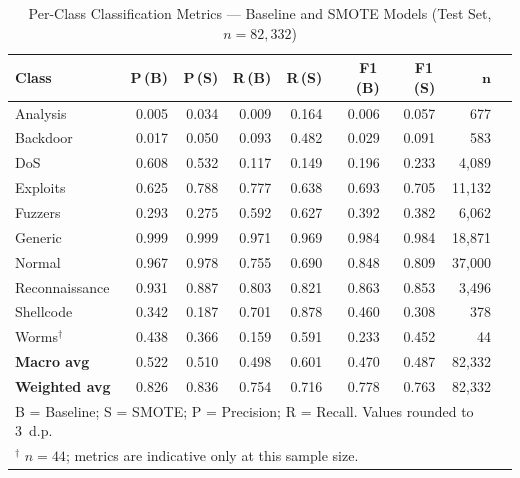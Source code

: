 \documentclass[conference,a4paper]{IEEEtran}
\begin{document}
\begin{table}[t]
  \caption{Per-Class Classification Metrics --- Baseline and SMOTE Models
           (Test Set, $n=82{,}332$)}
  \label{tab:perclass}
  \centering
  \begin{tabular}{lrrrrrrrr}
    \toprule
    \textbf{Class} &
      \textbf{P\,(B)} & \textbf{P\,(S)} &
      \textbf{R\,(B)} & \textbf{R\,(S)} &
      \textbf{F1\,(B)} & \textbf{F1\,(S)} &
      $\bm{n}$ \\
    \midrule
    Analysis          & 0.005 & 0.034 & 0.009 & 0.164 & 0.006 & 0.057 & 677 \\
    Backdoor          & 0.017 & 0.050 & 0.093 & 0.482 & 0.029 & 0.091 & 583 \\
    DoS               & 0.608 & 0.532 & 0.117 & 0.149 & 0.196 & 0.233 & 4,089 \\
    Exploits          & 0.625 & 0.788 & 0.777 & 0.638 & 0.693 & 0.705 & 11,132 \\
    Fuzzers           & 0.293 & 0.275 & 0.592 & 0.627 & 0.392 & 0.382 & 6,062 \\
    Generic           & 0.999 & 0.999 & 0.971 & 0.969 & 0.984 & 0.984 & 18,871 \\
    Normal            & 0.967 & 0.978 & 0.755 & 0.690 & 0.848 & 0.809 & 37,000 \\
    Reconnaissance    & 0.931 & 0.887 & 0.803 & 0.821 & 0.863 & 0.853 & 3,496 \\
    Shellcode         & 0.342 & 0.187 & 0.701 & 0.878 & 0.460 & 0.308 & 378 \\
    Worms$^\dagger$   & 0.438 & 0.366 & 0.159 & 0.591 & 0.233 & 0.452 & 44 \\
    \midrule
    \textbf{Macro avg}    & 0.522 & 0.510 & 0.498 & 0.601 & 0.470 & 0.487 & 82,332 \\
    \textbf{Weighted avg} & 0.826 & 0.836 & 0.754 & 0.716 & 0.778 & 0.763 & 82,332 \\
    \bottomrule
    \multicolumn{8}{l}{\footnotesize B = Baseline; S = SMOTE; P = Precision;
      R = Recall. Values rounded to 3~d.p.}\\
    \multicolumn{8}{l}{\footnotesize $^\dagger$ $n=44$; metrics are indicative
      only at this sample size.}\\
  \end{tabular}
\end{table}
\end{document}
